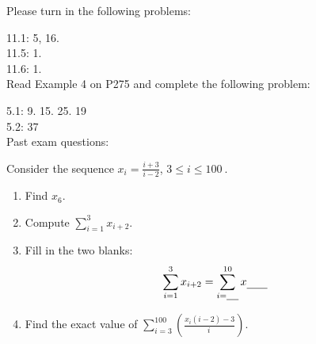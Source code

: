 \documentclass[12pt,twoside]{article}
\newcommand{\blank}[1]{\underline{\hspace{#1}}}
\newcommand{\dsst}{\displaystyle}
\begin{document}
Please turn in the following problems: 

11.1: 5, 16.\\
11.5: 1.\\
11.6: 1.\\

Read Example 4 on P275 and complete the following problem:

5.1: 9. 15. 25. 19 \\
5.2: 37\\

Past exam questions: 

Consider the sequence $x_i = \dsst\frac{i+3}{i-2}$, $3\leq i \leq 100\
$.

\begin{enumerate}
  \item Find $x_6$.

  \item Compute $\dsst\sum_{i=1}^3 x_{i+2}$.

  \item Fill in the two blanks: $$\dsst\sum_{i=1}^3 x_{i+2} = \dsst\sum_{i=\blank{0.15in}}^{10} x_{\blank{0.25in}}$$

  \item Find the exact value of $\dsst\sum_{i=3}^{100} \left(\frac{x_i(i-2)-3}{i\
}\right)$.

\end{enumerate}
\end{document}
